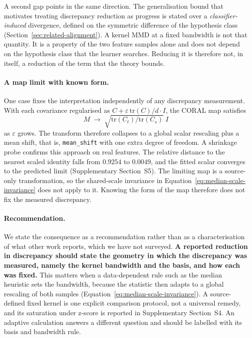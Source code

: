 A second gap points in the same direction. The generalisation bound that
motivates treating discrepancy reduction as progress is stated over a
\emph{classifier-induced} divergence, defined on the symmetric difference of
the hypothesis class (Section~\ref{sec:related-alignment}). A kernel MMD at a
fixed bandwidth is not that quantity. It is a property of the two feature
samples alone and does not depend on the hypothesis class that the learner
searches. Reducing it is therefore not, in itself, a reduction of the term that
the theory bounds.

\paragraph{A map limit with known form.} One case fixes the interpretation
independently of any discrepancy measurement. With each covariance regularised
as $C + \varepsilon\,\mathrm{tr}(C)/d \cdot I$, the CORAL map satisfies
\begin{equation}
  M \;\longrightarrow\; \sqrt{\mathrm{tr}(C_t)/\mathrm{tr}(C_s)} \; I
  \label{eq:coral-limit}
\end{equation}
as $\varepsilon$ grows. The transform therefore collapses to a global scalar
rescaling plus a mean shift, that is, \texttt{mean\_shift} with one extra
degree of freedom. A shrinkage probe confirms this approach on real features.
The relative distance to the nearest scaled identity falls from $0.9254$ to
$0.0049$, and the fitted scalar converges to the predicted limit
(Supplementary Section~S5). The limiting map is a source-only transformation,
so the shared-scale invariance in Equation~\ref{eq:median-scale-invariance}
does not apply to it. Knowing the form of the map therefore does not fix the
measured discrepancy.

\paragraph{Recommendation.} We state the consequence as a recommendation
rather than as a characterisation of what other work reports, which we have not
surveyed. \textbf{A reported reduction in discrepancy should state the geometry
in which the discrepancy was measured, namely the kernel bandwidth and the
basis, and how each was fixed.} This matters when a data-dependent rule such as
the median heuristic sets the bandwidth, because the statistic then adapts to a
global rescaling of both samples (Equation~\ref{eq:median-scale-invariance}).
A source-defined fixed kernel is one explicit comparison protocol, not a
universal remedy, and its saturation under z-score is reported in
Supplementary Section~S4. An adaptive calculation answers a different question
and should be labelled with its basis and bandwidth rule.

